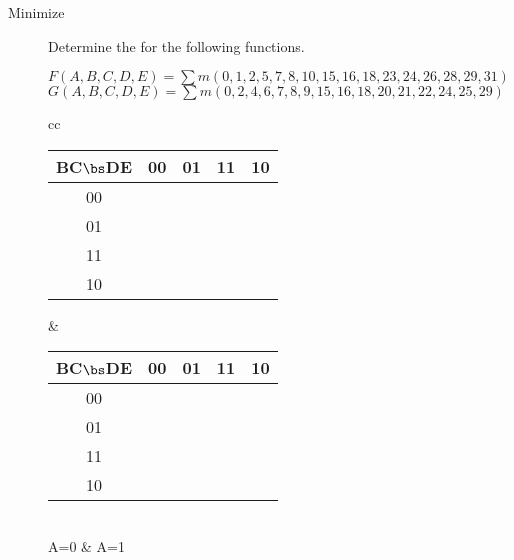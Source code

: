 \begin{description}
        \pagebreak

    \item[Minimize]  Determine the \SOPmin  for the following functions.

        \begin{description}
            \item[$F(A,B,C,D,E) = \sum m(0,1,2,5,7,8,10,15,16,18,23,24,26,28,29,31)$]
            \item[$G(A,B,C,D,E) = \sum m(0,2,4,6,7,8,9,15,16,18,20,21,22,24,25,29)$]
        \end{description}

        \begin{tabular}{cc}
            \begin{tabular} {c||c|c|c|c}
                BC$\bs$DE & 00 & 01 & 11 & 10 \\ \hline \hline
                00        &    &    &    &    \\ \hline
                01        &    &    &    &    \\ \hline
                11        &    &    &    &    \\ \hline
                10        &    &    &    &    \\
            \end{tabular}        &
            \begin{tabular} {c||c|c|c|c}
                BC$\bs$DE & 00 & 01 & 11 & 10 \\ \hline \hline
                00        &    &    &    &    \\ \hline
                01        &    &    &    &    \\ \hline
                11        &    &    &    &    \\ \hline
                10        &    &    &    &    \\
            \end{tabular}        \\
            A=0 & A=1             \\
                 \vspace{0.2in} \\


\end{tabular}
\end{description}
